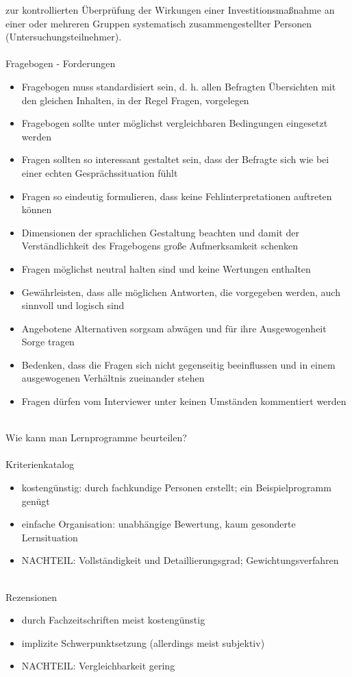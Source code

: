 \documentclass[a4paper]{article}
\begin{document}
zur kontrollierten Überprüfung der Wirkungen einer Investitionsmaßnahme an einer oder
mehreren Gruppen systematisch zusammengestellter Personen (Untersuchungsteilnehmer).
~\\~\\
Fragebogen - Forderungen
\begin{itemize}
	\item Fragebogen muss standardisiert sein, d. h. allen Befragten Übersichten mit den gleichen
	Inhalten, in der Regel Fragen, vorgelegen
	\item Fragebogen sollte unter möglichst vergleichbaren Bedingungen eingesetzt werden
	\item Fragen sollten so interessant gestaltet sein, dass der Befragte sich wie bei einer echten
	Gesprächssituation fühlt
	\item Fragen so eindeutig formulieren, dass keine Fehlinterpretationen auftreten können
	\item Dimensionen der sprachlichen Gestaltung beachten und damit der Verständlichkeit
	des Fragebogens große Aufmerksamkeit schenken
	\item Fragen möglichst neutral halten sind und keine Wertungen enthalten
	\item Gewährleisten, dass alle möglichen Antworten, die vorgegeben werden, auch
	sinnvoll und logisch sind
	\item Angebotene Alternativen sorgsam abwägen und für ihre Ausgewogenheit Sorge tragen
	\item Bedenken, dass die Fragen sich nicht gegenseitig beeinflussen und in einem
	ausgewogenen Verhältnis zueinander stehen
	\item Fragen dürfen vom Interviewer unter keinen Umständen kommentiert werden
\end{itemize}
~\\
Wie kann man Lernprogramme beurteilen?
\\~\\
Kriterienkatalog
\begin{itemize}
	\item kostengünstig: durch fachkundige Personen erstellt; ein Beispielprogramm genügt
	\item einfache Organisation: unabhängige Bewertung, kaum gesonderte Lernsituation
	\item NACHTEIL: Vollständigkeit und Detaillierungsgrad; Gewichtungsverfahren
\end{itemize}
~\\
Rezensionen
\begin{itemize}
	\item durch Fachzeitschriften meist kostengünstig
	\item implizite Schwerpunktsetzung (allerdings meist subjektiv)
	\item NACHTEIL: Vergleichbarkeit gering
\end{itemize}
\end{document}
